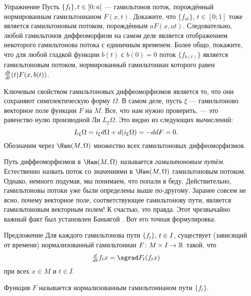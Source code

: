 \begin{ex}{Упражнение}\label{1.4.A}
Пусть $\{f_t\}, t \z\in [0; a]$ — гамильтонов поток, порождённый нормированным гамильтонианом $ F (x, t)$.
Докажите, что $\{f_{at}\}$, $t \in [0; 1]$ тоже является гамильтоновым потоком, порождённым $aF (x, at)$.
Следовательно, любой гамильтонов диффеоморфизм на самом деле является отображением некоторого гамильтонова потока с единичным временем.
Более общо, покажите, что для любой гладкой функции $b (t)$ с $b (0) =
0$ поток $\{f_{b (t)}\}$ является гамильтоновым потоком, нормированный
гамильтониан которого равен $\tfrac{d b}{d t} (t) F (x, b (t))$.
\end{ex}

Ключевым свойством гамильтоновых диффеоморфизмов является то, что они сохраняют симплектическую форму $\Omega$.
В самом деле, пусть $\xi$ — гамильтоново векторное поле функции $F$ на $M$.
Все, что нам нужно проверить, — это равенство нулю производной Ли $L_\xi \Omega$.
Это видно из следующих вычислений: 
\[L_\xi \Omega = i_\xi d\Omega + d (i_\xi \Omega) = -dd F = 0.\]
Обозначим через $\Ham (M, \Omega)$ множество всех гамильтоновых диффеоморфизмов.

Путь диффеоморфизмов в $\Ham (M, \Omega)$ называется \emph{гамильтоновым путём}.
Естественно назвать поток со значениями в $\Ham (M, \Omega)$ гамильтоновым потоком.
Однако, немного подумав, мы понимаем, что попали в беду.
Действительно, гамильтоновы потоки уже были определены выше по-другому.
Заранее совсем не ясно, почему векторное поле, соответствующее гамильтонову пути, является гамильтоновым векторным полем!
К счастью, это правда.
Этот чрезвычайно важный факт был установлен Баньягой \cite{B1}.
Вот его точная формулировка.

\begin{thm}{Предложение}\label{1.4.B}
Для каждого гамильтонова пути $\{f_t\}$, $t \z\in I$, существует (зависящий от времени) нормализованный гамильтониан $F\colon M \times I \to \mathbb{R}$ такой, что 
\[\tfrac \d{\d t} f_t x = \sgrad F_t (f_t x)\]
при всех $x \in M$ и $t \in I$.
\end{thm}

Функция $F$ называется нормализованным гамильтонианом
пути $\{f_t\}$.


